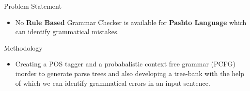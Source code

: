 \documentclass{beamer}
\begin{document}





\begin{frame}{Problem Statement}
\begin{itemize}
\item  No \textbf{Rule Based} Grammar Checker is available for \textbf{Pashto Language} which can identify grammatical mistakes.
\end{itemize}
\end{frame}


\begin{frame}{Methodology}
\begin{itemize}
	\item Creating a POS tagger and a probabalistic context free grammar (PCFG) inorder to generate parse trees and also developing a tree-bank with the help of which we can identify grammatical errors in an input sentence.
\end{itemize}
\end{frame}
\end{document}
